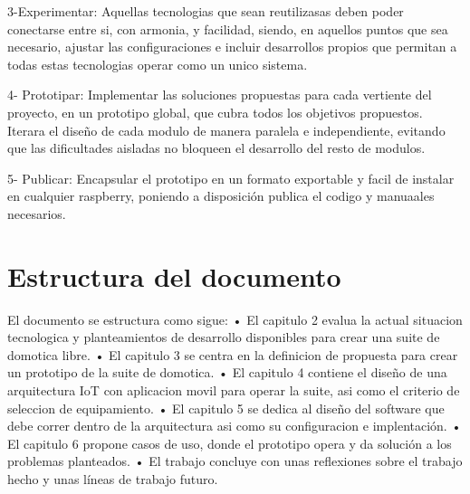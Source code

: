 3-Experimentar: Aquellas tecnologias que sean reutilizasas deben poder conectarse entre si, con armonia, y facilidad, siendo, en aquellos puntos que sea necesario, ajustar las configuraciones e incluir desarrollos propios que permitan a todas estas tecnologias operar como un unico sistema.

4- Prototipar: Implementar las soluciones propuestas para cada vertiente del proyecto, en un prototipo global, que cubra todos los objetivos propuestos. Iterara el diseño de cada modulo de manera paralela e independiente, evitando que las dificultades aisladas no bloqueen el desarrollo del resto de modulos.

5- Publicar: Encapsular el prototipo en un formato exportable y facil de instalar en cualquier raspberry, poniendo a disposición publica el codigo y manuaales necesarios.

\section{Estructura del documento}
\label{ch:Capitulo1.4}

El documento se estructura como sigue:
• El capitulo 2 evalua la actual situacion tecnologica y planteamientos de desarrollo disponibles para crear una suite de domotica libre.
• El capitulo 3 se centra en la definicion de propuesta para crear un prototipo de la suite de domotica.
• El capitulo 4 contiene el diseño de una arquitectura IoT con aplicacion movil para operar la suite, asi como el criterio de seleccion de equipamiento.
• El capitulo 5 se dedica al diseño del software que debe correr dentro de la arquitectura asi como su configuracion e implentación.
• El capitulo 6 propone casos de uso, donde el prototipo opera y da solución a los problemas planteados.
• El trabajo concluye con unas reflexiones sobre el trabajo hecho y unas líneas de trabajo futuro.
